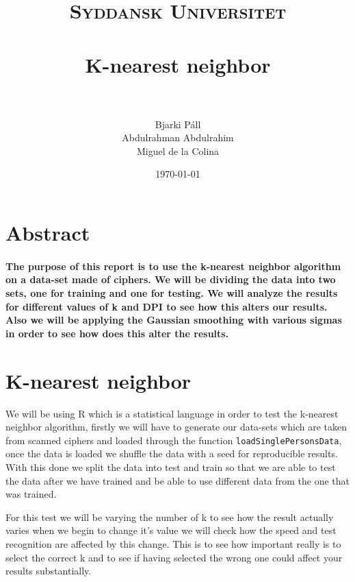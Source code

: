 \documentclass[paper=a4, fontsize=11pt]{scrartcl} %
\title{	
\normalfont \normalsize 
\textsc{Syddansk Universitet} \\ [25pt] 
\horrule{0.5pt} \\[0.4cm] %
\huge K-nearest neighbor \\ %
\horrule{2pt} \\[0.5cm] %
}
\author{Bjarki Páll \\ Abdulrahman Abdulrahim \\ Miguel de la Colina}
\date{\normalsize\today} %
\numberwithin{equation}{section} %
\numberwithin{figure}{section} %
\numberwithin{table}{section} %
\begin{document}
\maketitle %



\section*{Abstract}

\paragraph{The purpose of this report is to use the k-nearest neighbor algorithm on a data-set made of ciphers. We will be dividing the data into two sets, one for training and one for testing. We will analyze the results for different values of k and DPI to see how this alters our results. Also we will be applying the  Gaussian smoothing with various sigmas in order to see how does this alter the results.}  




\section{K-nearest neighbor}
\begin{flushleft}
We will be using R which is a statistical language in order to test the k-nearest neighbor algorithm, firstly we will have to generate our data-sets which are taken from scanned ciphers and loaded through the function \texttt{loadSinglePersonsData}, once the data is loaded we shuffle the data with a seed for reproducible results. With this done we split the data into test and train so that we are able to test the data after we have trained and be able to use different data from the one that was trained.
\end{flushleft}

\begin{flushleft}
For this test we will be varying the number of k to see how the result actually varies when we begin to change it's value we will check how the speed and test recognition are affected by this change. This is to see how important really is to select the correct k and to see if having selected the wrong one could affect your results substantially.
\end{flushleft}
\end{document}
